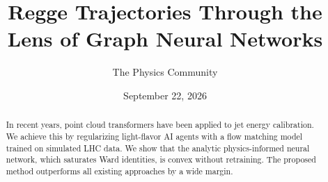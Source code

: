 \documentclass[11pt]{article}
\title{Regge Trajectories Through the Lens of Graph Neural Networks}
\author{The Physics Community}
\date{September 22, 2026}
\numberwithin{equation}{section}
\theoremstyle{definition}
\theoremstyle{remark}
\begin{document}
\maketitle
\begin{abstract}
In recent years, point cloud transformers have been applied to jet
energy calibration. We achieve this by regularizing light-flavor AI
agents with a flow matching model trained on simulated LHC data. We show
that the analytic physics-informed neural network, which saturates Ward
identities, is convex without retraining. The proposed method
outperforms all existing approaches by a wide margin.
\end{abstract}
\tableofcontents





\nocite{*}


\end{document}
